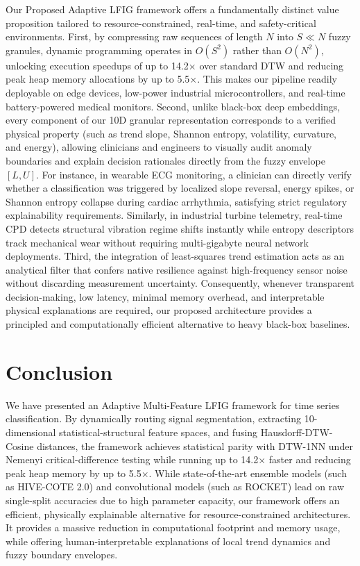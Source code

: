 \documentclass[conference]{IEEEtran}
\begin{document}
Our Proposed Adaptive LFIG framework offers a fundamentally distinct value proposition tailored to resource-constrained, real-time, and safety-critical environments. First, by compressing raw sequences of length $N$ into $S \ll N$ fuzzy granules, dynamic programming operates in $O(S^2)$ rather than $O(N^2)$, unlocking execution speedups of up to 14.2$\times$ over standard DTW and reducing peak heap memory allocations by up to 5.5$\times$. This makes our pipeline readily deployable on edge devices, low-power industrial microcontrollers, and real-time battery-powered medical monitors. Second, unlike black-box deep embeddings, every component of our 10D granular representation corresponds to a verified physical property (such as trend slope, Shannon entropy, volatility, curvature, and energy), allowing clinicians and engineers to visually audit anomaly boundaries and explain decision rationales directly from the fuzzy envelope $[L, U]$. For instance, in wearable ECG monitoring, a clinician can directly verify whether a classification was triggered by localized slope reversal, energy spikes, or Shannon entropy collapse during cardiac arrhythmia, satisfying strict regulatory explainability requirements. Similarly, in industrial turbine telemetry, real-time CPD detects structural vibration regime shifts instantly while entropy descriptors track mechanical wear without requiring multi-gigabyte neural network deployments. Third, the integration of least-squares trend estimation acts as an analytical filter that confers native resilience against high-frequency sensor noise without discarding measurement uncertainty. Consequently, whenever transparent decision-making, low latency, minimal memory overhead, and interpretable physical explanations are required, our proposed architecture provides a principled and computationally efficient alternative to heavy black-box baselines.

\section{Conclusion}
We have presented an Adaptive Multi-Feature LFIG framework for time series classification. By dynamically routing signal segmentation, extracting 10-dimensional statistical-structural feature spaces, and fusing Hausdorff-DTW-Cosine distances, the framework achieves statistical parity with DTW-1NN under Nemenyi critical-difference testing while running up to 14.2$\times$ faster and reducing peak heap memory by up to 5.5$\times$. While state-of-the-art ensemble models (such as HIVE-COTE 2.0) and convolutional models (such as ROCKET) lead on raw single-split accuracies due to high parameter capacity, our framework offers an efficient, physically explainable alternative for resource-constrained architectures. It provides a massive reduction in computational footprint and memory usage, while offering human-interpretable explanations of local trend dynamics and fuzzy boundary envelopes.
\end{document}

